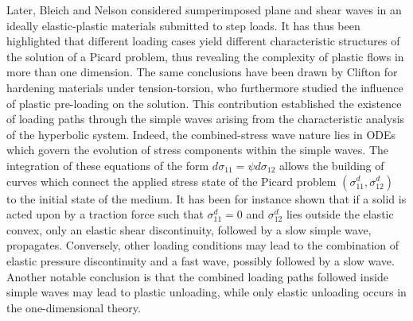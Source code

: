 Later, Bleich and Nelson \cite{Bleich} considered sumperimposed plane and shear waves in an ideally elastic-plastic materials submitted to step loads.
It has thus been highlighted that different loading cases yield different characteristic structures of the solution of a Picard problem, thus revealing the complexity of plastic flows in more than one dimension.
The same conclusions have been drawn by Clifton \cite{Clifton} for hardening materials under tension-torsion, who furthermore studied the influence of plastic pre-loading on the solution.
This contribution established the existence of loading paths through the simple waves arising from the characteristic analysis of the hyperbolic system.
Indeed, the combined-stress wave nature lies in ODEs which govern the evolution of stress components within the simple waves.
The integration of these equations of the form $d\sigma_{11}=\psi d\sigma_{12}$ allows the building of curves which connect the applied stress state of the Picard problem $(\sigma^d_{11},\sigma^d_{12})$ to the initial state of the medium.
It has been for instance shown that if a solid is acted upon by a traction force such that $\sigma^d_{11}=0$ and $\sigma^d_{12}$ lies outside the elastic convex, only an elastic shear discontinuity, followed by a slow simple wave, propagates.
Conversely, other loading conditions may lead to the combination of elastic pressure discontinuity and a fast wave, possibly followed by a slow wave.
Another notable conclusion is that the combined loading paths followed inside simple waves may lead to plastic unloading, while only elastic unloading occurs in the one-dimensional theory.

